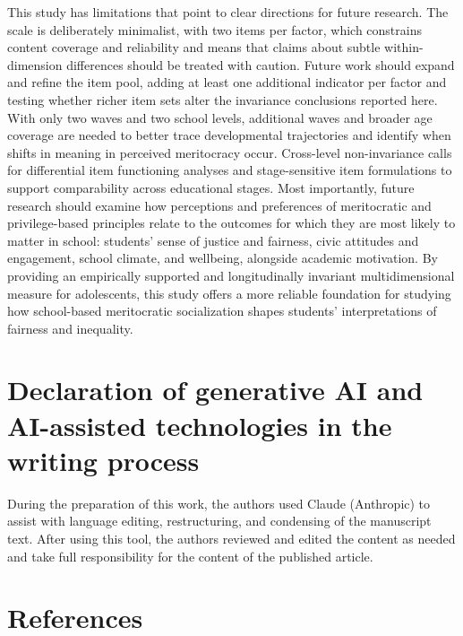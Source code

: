 \documentclass[
  13pt,
]{article}
\begin{document}
This study has limitations that point to clear directions for future
research. The scale is deliberately minimalist, with two items per
factor, which constrains content coverage and reliability and means that
claims about subtle within-dimension differences should be treated with
caution. Future work should expand and refine the item pool, adding at
least one additional indicator per factor and testing whether richer
item sets alter the invariance conclusions reported here. With only two
waves and two school levels, additional waves and broader age coverage
are needed to better trace developmental trajectories and identify when
shifts in meaning in perceived meritocracy occur. Cross-level
non-invariance calls for differential item functioning analyses and
stage-sensitive item formulations to support comparability across
educational stages. Most importantly, future research should examine how
perceptions and preferences of meritocratic and privilege-based
principles relate to the outcomes for which they are most likely to
matter in school: students' sense of justice and fairness, civic
attitudes and engagement, school climate, and wellbeing, alongside
academic motivation. By providing an empirically supported and
longitudinally invariant multidimensional measure for adolescents, this
study offers a more reliable foundation for studying how school-based
meritocratic socialization shapes students' interpretations of fairness
and inequality.

\section{Declaration of generative AI and AI-assisted technologies in
the writing
process}\label{declaration-of-generative-ai-and-ai-assisted-technologies-in-the-writing-process}

During the preparation of this work, the authors used Claude (Anthropic)
to assist with language editing, restructuring, and condensing of the
manuscript text. After using this tool, the authors reviewed and edited
the content as needed and take full responsibility for the content of
the published article.

\section{References}\label{references}
\end{document}
